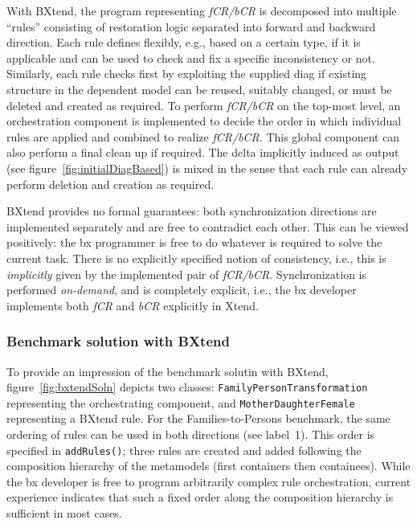 With BXtend, the program representing \emph{fCR/bCR} is decomposed into multiple ``rules'' consisting of restoration logic separated into forward and backward direction.
Each rule defines flexibly, e.g., based on a certain type, if it is applicable and can be used to check and fix a specific inconsistency or not.
Similarly, each rule checks first by exploiting the supplied diag if existing structure in the dependent model can be reused, suitably changed, or must be deleted and created as required.
To perform \emph{fCR/bCR} on the top-most level, an orchestration component is implemented to decide the order in which individual rules are applied and combined to realize \emph{fCR/bCR}.
This global component can also perform a final clean up if required.
The delta implicitly induced as output (see figure~\ref{fig:initialDiagBased}) is mixed in the sense that each rule can already perform deletion and creation as required.

BXtend provides no formal guarantees: both synchronization directions are implemented separately and are free to contradict each other.
This can be viewed positively: the bx programmer is free to do whatever is required to solve the current task.
%
There is no explicitly specified notion of consistency, i.e., this is \emph{implicitly} given by the implemented pair of \emph{fCR/bCR}.
%
Synchronization is performed \emph{on-demand}, and is completely explicit, i.e., the bx developer implements both \emph{fCR} and \emph{bCR} explicitly in Xtend.

\subsubsection{Benchmark solution with BXtend}

To provide an impression of the benchmark solutin with BXtend, figure~\ref{fig:bxtendSoln} depicts two classes:  \texttt{Family\-Person\-Transformation} representing the orchestrating component, and \texttt{Mother\-Daughter\-Female} representing a BXtend rule.
For the Families-to-Persons benchmark, the same ordering of rules can be used in both directions (see label~1).
This order is specified in \texttt{addRules()}; three rules are created and added following the composition hierarchy of the metamodels (first containers then containees).
While the bx developer is free to program arbitrarily complex rule orchestration, current experience indicates that such a fixed order along the composition hierarchy is sufficient in most cases.

